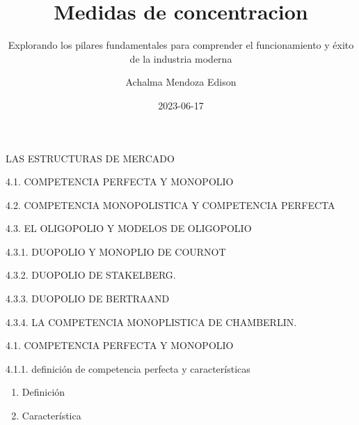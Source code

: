 \documentclass[
  letterpaper,
  DIV=11,
  numbers=noendperiod]{scrartcl}
\title{Medidas de concentracion}
\subtitle{Explorando los pilares fundamentales para comprender el
funcionamiento y éxito de la industria moderna}
\author{Achalma Mendoza Edison}
\date{2023-06-17}
\providecommand{\tightlist}{%
  \setlength{\itemsep}{0pt}\setlength{\parskip}{0pt}}\usepackage{longtable,booktabs,array}
\begin{document}
\maketitle
\ifdefined\Shaded\renewenvironment{Shaded}{\begin{tcolorbox}[sharp corners, interior hidden, breakable, enhanced, boxrule=0pt, borderline west={3pt}{0pt}{shadecolor}, frame hidden]}{\end{tcolorbox}}\fi

LAS ESTRUCTURAS DE MERCADO

4.1. COMPETENCIA PERFECTA Y MONOPOLIO

4.2. COMPETENCIA MONOPOLISTICA Y COMPETENCIA PERFECTA

4.3. EL OLIGOPOLIO Y MODELOS DE OLIGOPOLIO

4.3.1. DUOPOLIO Y MONOPLIO DE COURNOT

4.3.2. DUOPOLIO DE STAKELBERG.

4.3.3. DUOPOLIO DE BERTRAAND

4.3.4. LA COMPETENCIA MONOPLISTICA DE CHAMBERLIN.

4.1. COMPETENCIA PERFECTA Y MONOPOLIO

4.1.1. definición de competencia perfecta y características

\begin{enumerate}
\def\labelenumi{\Alph{enumi})}
\tightlist
\item
  Definición
\item
  Característica
\end{enumerate}
\end{document}
